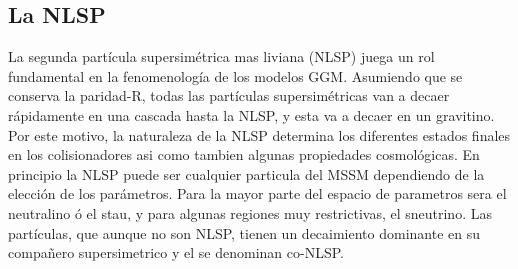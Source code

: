 



\subsection{La NLSP}

La segunda partícula supersimétrica mas liviana (NLSP) juega un rol fundamental
en la fenomenología de los modelos GGM. Asumiendo que se conserva la paridad-R,
todas las partículas supersimétricas van a decaer rápidamente en una cascada
hasta la NLSP, y esta va a decaer en un gravitino. Por este motivo, la
naturaleza de la NLSP determina los diferentes estados finales en los
colisionadores asi como tambien algunas propiedades cosmológicas. En principio
la NLSP puede ser cualquier particula del MSSM dependiendo de la elección de los
parámetros. Para la mayor parte del espacio de parametros sera el neutralino ó
el stau, y para algunas regiones muy restrictivas, el
sneutrino\cite{arxiv:9801271}.
Las partículas, que aunque no son NLSP, tienen un decaimiento dominante en su
compañero supersimetrico y el {\gravino} se denominan co-NLSP.



